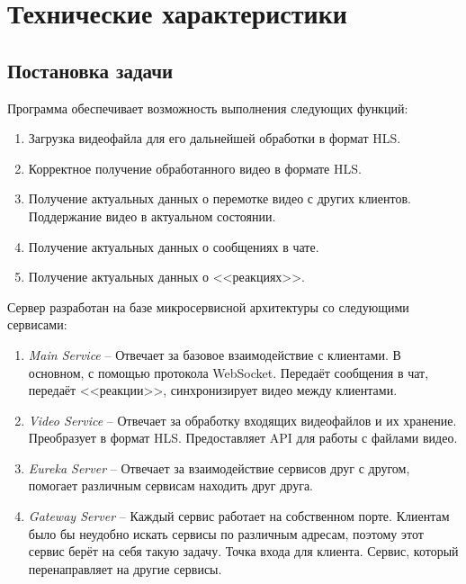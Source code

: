 \documentclass{../includes/TechDoc}
\begin{document}
    \section{Технические характеристики}

    \subsection{Постановка задачи}

    Программа обеспечивает возможность выполнения следующих функций:
    \begin{enumerate}
        \item Загрузка видеофайла для его дальнейшей обработки в формат HLS.
        \item Корректное получение обработанного видео в формате HLS.
        \item Получение актуальных данных о перемотке видео с других клиентов.
        Поддержание видео в актуальном состоянии.
        \item Получение актуальных данных о сообщениях в чате.
        \item Получение актуальных данных о <<реакциях>>.
    \end{enumerate}

    Сервер разработан на базе микросервисной архитектуры со следующими сервисами:
    \begin{enumerate}
        \item \emph{Main Service} -- Отвечает за базовое взаимодействие с клиентами.
        В основном, с помощью протокола WebSocket.
        Передаёт сообщения в чат, передаёт <<реакции>>, синхронизирует видео между клиентами.
        \item \emph{Video Service} -- Отвечает за обработку входящих видеофайлов и их хранение.
        Преобразует в формат HLS.
        Предоставляет API для работы с файлами видео.
        \item \emph{Eureka Server} -- Отвечает за взаимодействие сервисов друг с другом, помогает различным сервисам находить друг друга.
        \item \emph{Gateway Server} -- Каждый сервис работает на собственном порте.
        Клиентам было бы неудобно искать сервисы по различным адресам, поэтому этот сервис берёт на себя такую задачу.
        Точка входа для клиента. Сервис, который перенаправляет на другие сервисы.
    \end{enumerate}

    \newpage
\end{document}
